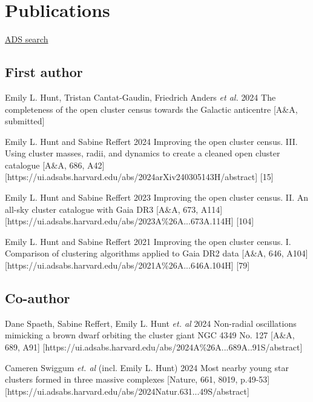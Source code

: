 \section*{Publications}

\href{\cvADSLink}{ADS search \faLink}%


\subsection*{First author}

\begin{etaremune}
    \item \publication
        {Emily L. Hunt, Tristan Cantat-Gaudin, Friedrich Anders \emph{et al.}}
        {2024}
        {The completeness of the open cluster census towards the Galactic anticentre}
        [A\&A, submitted]
    \item \publication
        {Emily L. Hunt and Sabine Reffert}
        {2024}
        {Improving the open cluster census. III. Using cluster masses, radii, and dynamics to create a cleaned open cluster catalogue}
        [A\&A, 686, A42]
        [https://ui.adsabs.harvard.edu/abs/2024arXiv240305143H/abstract]
        [15]
    \item \publication
        {Emily L. Hunt and Sabine Reffert}
        {2023}
        {Improving the open cluster census. II. An all-sky cluster catalogue with Gaia DR3}
        [A\&A, 673, A114]
        [https://ui.adsabs.harvard.edu/abs/2023A\%26A...673A.114H]
        [104]
    \item \publication
        {Emily L. Hunt and Sabine Reffert}
        {2021}
        {Improving the open cluster census. I. Comparison of clustering algorithms applied to Gaia DR2 data}
        [A\&A, 646, A104]
        [https://ui.adsabs.harvard.edu/abs/2021A\%26A...646A.104H]
        [79]
\end{etaremune}


\subsection*{Co-author}

\begin{etaremune}
    \item \publication
        {Dane Spaeth, Sabine Reffert, Emily L. Hunt \emph{et. al}}
        {2024}
        {Non-radial oscillations mimicking a brown dwarf orbiting the cluster giant NGC 4349 No. 127}
        [A\&A, 689, A91]
        [https://ui.adsabs.harvard.edu/abs/2024A\%26A...689A..91S/abstract]
    \item \publication
        {Cameren Swiggum \emph{et. al} (incl. Emily L. Hunt)}
        {2024}
        {Most nearby young star clusters formed in three massive complexes }
        [Nature, 661, 8019, p.49-53]
        [https://ui.adsabs.harvard.edu/abs/2024Natur.631...49S/abstract]
\end{etaremune}
